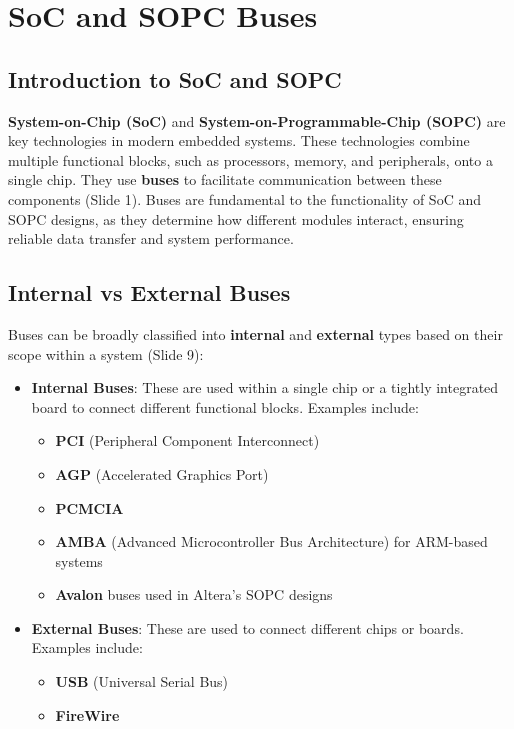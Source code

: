 \documentclass[
  14pt,
  a4paper,
  numbers=noendperiod,
  headinclude=true,
  footinclude=true,
  DIV=calc]{scrreprt}
\begin{document}
\chapter{SoC and SOPC Buses}\label{soc-and-sopc-buses}

\section{Introduction to SoC and
SOPC}\label{introduction-to-soc-and-sopc}

\textbf{System-on-Chip (SoC)} and \textbf{System-on-Programmable-Chip
(SOPC)} are key technologies in modern embedded systems. These
technologies combine multiple functional blocks, such as processors,
memory, and peripherals, onto a single chip. They use \textbf{buses} to
facilitate communication between these components (Slide 1). Buses are
fundamental to the functionality of SoC and SOPC designs, as they
determine how different modules interact, ensuring reliable data
transfer and system performance.

\section{Internal vs External Buses}\label{internal-vs-external-buses}

Buses can be broadly classified into \textbf{internal} and
\textbf{external} types based on their scope within a system (Slide 9):

\begin{itemize}
\item
  \textbf{Internal Buses}: These are used within a single chip or a
  tightly integrated board to connect different functional blocks.
  Examples include:

  \begin{itemize}
  \item
    \textbf{PCI} (Peripheral Component Interconnect)
  \item
    \textbf{AGP} (Accelerated Graphics Port)
  \item
    \textbf{PCMCIA}
  \item
    \textbf{AMBA} (Advanced Microcontroller Bus Architecture) for
    ARM-based systems
  \item
    \textbf{Avalon} buses used in Altera's SOPC designs
  \end{itemize}
\item
  \textbf{External Buses}: These are used to connect different chips or
  boards. Examples include:

  \begin{itemize}
  \item
    \textbf{USB} (Universal Serial Bus)
  \item
    \textbf{FireWire}
  \end{itemize}
\end{itemize}
\end{document}
